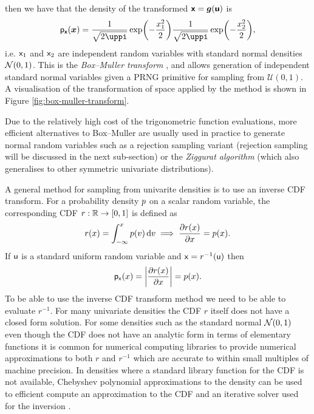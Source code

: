 then we have that the density of the transformed $\boldsymbol{\mathsf{x}} = \boldsymbol{g}(\boldsymbol{\mathsf{u}})$ is
\begin{equation}\label{eq:box-muller-transform-density}
  \pden{\rvct{x}}(\vct{x}) = 
  \frac{1}{\sqrt{2\uppi}}\exp\lpa-\frac{x_1^2}{2}\rpa
  \frac{1}{\sqrt{2\uppi}}\exp\lpa-\frac{x_2^2}{2}\rpa ,
\end{equation}
i.e. $\mathsf{x}_1$ and $\mathsf{x}_2$ are independent random variables with standard normal densities $\nrm{0,1}$. This is the \emph{Box--Muller transform} \citep{box1958note}, and allows generation of independent standard normal variables given a \ac{PRNG} primitive for sampling from $\mathcal{U}(0,1)$. A visualisation of the transformation of space applied by the method is shown in Figure \ref{fig:box-muller-transform}. 

Due to the relatively high cost of the trigonometric function evaluations, more efficient alternatives to Box--Muller are usually used in practice to generate normal random variables such as a rejection sampling variant \citep{marsaglia1968random} (rejection sampling will be discussed in the next sub-section) or the \emph{Ziggurat algorithm} \citep{marsaglia2000ziggurat} (which also generalises to other symmetric univariate distributions).

A general method for sampling from univarite densities is to use an inverse \ac{CDF} transform. For a probability density $p$ on a scalar random variable, the corresponding \ac{CDF} $r : \mathbb{R} \to [0,1]$ is defined as
\begin{equation}
  r(x) = \int_{-\infty}^x p(v) \,\mathrm{d} v
  \implies
  \frac{\partial r(x)}{\partial x} = p(x).
\end{equation}
If $\mathsf{u}$ is a standard uniform random variable and $\mathsf{x} = r^{-1}(\mathsf{u})$ then
\begin{equation}
  \pden{\rvar{x}}(x) = \left|\pd{r(x)}{x}\right| = \tgtdens(x).
\end{equation}
To be able to use the inverse \ac{CDF} transform method we need to be able to evaluate $r^{-1}$. For many univariate densities the \ac{CDF} $r$ itself does not have a closed form solution. For some densities such as the standard normal $\nrm{0,1}$ even though the \ac{CDF} does not have an analytic form in terms of elementary functions it is common for numerical computing libraries to provide numerical approximations to both $r$ and $r^{-1}$ which are accurate to within small multiples of machine precision. In densities where a standard library function for the \ac{CDF} is not available, Chebyshev polynomial approximations to the density can be used to efficient compute an approximation to the \ac{CDF} and an iterative solver used for the inversion \citep{olver2013fast}.


